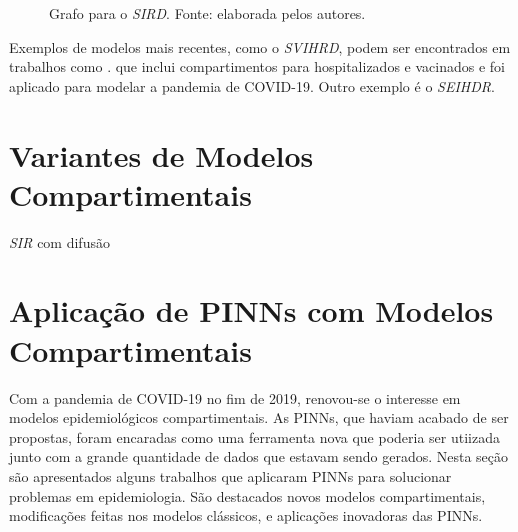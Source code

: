 \begin{figure}
\centering
{}
\caption{Grafo para o \textit{SIRD}. Fonte: elaborada pelos autores.}
\label{fig:sirv-grafo}
\end{figure}

Exemplos de modelos mais recentes, como o \textit{SVIHRD}, podem ser encontrados
em trabalhos como \cite{nelson-etal:24-japao}.
que inclui compartimentos para hospitalizados e vacinados e foi aplicado para 
modelar a pandemia de COVID-19. Outro exemplo é o \textit{SEIHDR}. 

\section{Variantes de Modelos Compartimentais}

\textit{SIR} com difusão \cite{noble:1974-sir-difusao}    

\section{Aplicação de PINNs com Modelos Compartimentais}

Com a pandemia de COVID-19 no fim de 2019, renovou-se o interesse em modelos
epidemiológicos compartimentais. As PINNs, que haviam acabado de ser propostas,
foram encaradas como uma ferramenta nova que poderia ser utiizada junto com 
a grande quantidade de dados que estavam sendo gerados. 
Nesta seção são apresentados alguns trabalhos que aplicaram PINNs para solucionar
problemas em epidemiologia. São destacados novos modelos compartimentais, 
modificações feitas nos modelos clássicos, e aplicações inovadoras das PINNs.  

